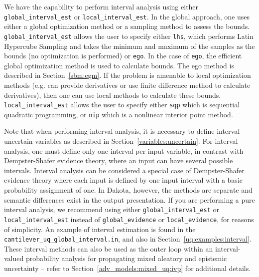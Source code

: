We have the capability to perform interval analysis using either
\texttt{global\_interval\_est} or \texttt{local\_interval\_est}.
In the global approach, one uses either a global optimization 
method or a sampling method to assess the bounds. 
\texttt{global\_interval\_est}
allows the user to specify either \texttt{lhs}, which performs 
Latin Hypercube Sampling and takes the minimum and maximum of 
the samples as the bounds (no optimization is 
performed) or \texttt{ego}. In the case of \texttt{ego}, 
the efficient global optimization method is used to calculate 
bounds. The ego method is described in Section~\ref{sbm:egm}.
If the problem is amenable to local optimization 
methods (e.g. can provide derivatives or use finite difference 
method to calculate derivatives), then one can use local
methods to calculate these bounds. \texttt{local\_interval\_est}
allows the user to specify either \texttt{sqp} which is sequential 
quadratic programming, or \texttt{nip} which is a nonlinear interior point 
method. 

Note that when performing interval analysis, it is necessary to define
interval uncertain variables as described in
Section~\ref{variables:uncertain}. For interval analysis, one must
define only one interval per input variable, in contrast with
Dempster-Shafer evidence theory, where an input can have several
possible intervals. Interval analysis can be considered a special
case of Dempster-Shafer evidence theory where each input is defined by
one input interval with a basic probability assignment of one. In
Dakota, however, the methods are separate and semantic differences
exist in the output presentation. If you are performing a pure
interval analysis, we recommend using either
\texttt{global\_interval\_est} or \texttt{local\_interval\_est}
instead of \texttt{global\_evidence} or \texttt{local\_evidence}, for
reasons of simplicity. An example of interval estimation is found in
the \texttt{cantilever\_uq\_global\_interval.in}, and also
in Section~\ref{uq:examples:interval}.
These interval methods can also be used as the outer loop within an
interval-valued probability analysis for propagating mixed aleatory
and epistemic uncertainty -- refer to
Section~\ref{adv_models:mixed_uq:ivp} for additional details.


